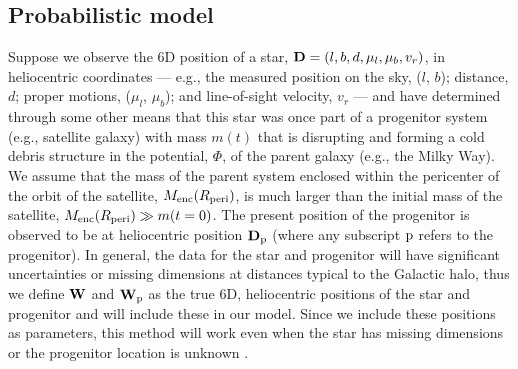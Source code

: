\documentclass{emulateapj}
\newcommand{\D}{{\bf D}}
\newcommand{\W}{{\bf W}}
\newcommand{\sat}{{\rm p}}
\begin{document}
\subsection{Probabilistic model}
Suppose we observe the 6D position of a star, $\D = (l,b,d,\mu_l,\mu_b,v_r)$, in heliocentric coordinates --- e.g., the measured position on the sky, ($l$, $b$); distance, $d$; proper motions, ($\mu_l$, $\mu_b$); and line-of-sight velocity, $v_r$ --- and have determined through some other means that this star was once part of a progenitor system (e.g., satellite galaxy) with mass $m(t)$ that is disrupting and forming a cold debris structure in the potential, $\Phi$, of the parent galaxy (e.g., the Milky Way). We assume that the mass of the parent system enclosed within the pericenter of the orbit of the satellite, $M_{\rm enc}(R_{\rm peri})$, is much larger than the initial mass of the satellite, $M_{\rm enc}(R_{\rm peri})\gg m(t=0)$. The present position of the progenitor is observed to be at heliocentric position $\D_\sat$ (where any subscript $\sat$ refers to the progenitor). In general, the data for the star and progenitor will have significant uncertainties or missing dimensions at distances typical to the Galactic halo, thus we define $\W$ and $\W_\sat$ as the true 6D, heliocentric positions of the star and progenitor and will include these in our model. Since we include these positions as parameters, this method will work even when the star has missing dimensions or the progenitor location is unknown \citep[as in the Orphan stream,][]{belokurov07}.
\end{document}
